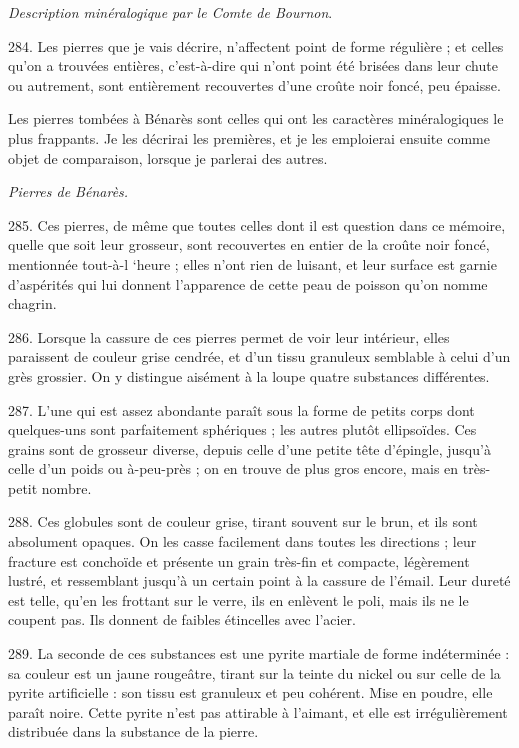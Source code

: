 \documentclass[a4paper, 11pt, oneside, polutonikogreek, french]{article}
\begin{document}
\begin{center}
\emph{Description minéralogique par le Comte de Bournon}.
\end{center}

284. \og Les pierres que je vais décrire, n'affectent point de forme régulière ; et celles qu'on a trouvées entières, c'est-à-dire qui n'ont point été brisées dans leur chute ou autrement, sont entièrement recouvertes d'une croûte noir foncé, peu épaisse.

Les pierres tombées à Bénarès sont celles qui ont les caractères minéralogiques le plus frappants. Je les décrirai les premières, et je les emploierai ensuite comme objet de comparaison, lorsque je parlerai des autres.

\begin{center}
\emph{Pierres de Bénarès.}
\end{center}

285. Ces pierres, de même que toutes celles dont il est question dans ce mémoire, quelle que soit leur grosseur, sont recouvertes en entier de la croûte noir foncé, mentionnée tout-à-l ‘heure ; elles n'ont rien de luisant, et leur surface est garnie d'aspérités qui lui donnent l'apparence de cette peau de poisson qu'on nomme chagrin.

286. Lorsque la cassure de ces pierres permet de voir leur intérieur, elles paraissent de couleur grise cendrée, et d'un tissu granuleux semblable à celui d'un grès grossier. On y distingue aisément à la loupe quatre substances différentes.

287. L'une qui est assez abondante paraît sous la forme de petits corps dont quelques-uns sont parfaitement sphériques ; les autres plutôt ellipsoïdes. Ces grains sont de grosseur diverse, depuis celle d'une petite tête d'épingle, jusqu'à celle d'un poids ou à-peu-près ; on en trouve de plus gros encore, mais en très-petit nombre.

288. Ces globules sont de couleur grise, tirant souvent sur le brun, et ils sont absolument opaques. On les casse facilement dans toutes les directions ; leur fracture est conchoïde et présente un grain très-fin et compacte, légèrement lustré, et ressemblant jusqu'à un certain point à la cassure de l'émail. Leur dureté est telle, qu'en les frottant sur le verre, ils en enlèvent le poli, mais ils ne le coupent pas. Ils donnent de faibles étincelles avec l'acier.

289. La seconde de ces substances est une pyrite martiale de forme indéterminée : sa couleur est un jaune rougeâtre, tirant sur la teinte du nickel ou sur celle de la pyrite artificielle : son tissu est granuleux et peu cohérent. Mise en poudre, elle paraît noire. Cette pyrite n'est pas attirable à l'aimant, et elle est irrégulièrement distribuée dans la substance de la pierre.
\end{document}
